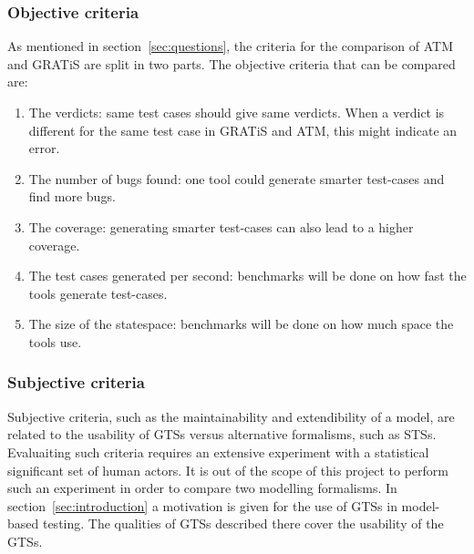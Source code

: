 \subsubsection{Objective criteria}
As mentioned in section~\ref{sec:questions}, the criteria for the comparison of ATM and GRATiS are split in two parts. The objective criteria that can be compared are:
\begin{enumerate}
  \item The verdicts: same test cases should give same verdicts. When a verdict is different for the same test case in GRATiS and ATM, this might indicate an error.
  \item The number of bugs found: one tool could generate smarter test-cases and find more bugs.
  \item The coverage: generating smarter test-cases can also lead to a higher coverage.
  \item The test cases generated per second: benchmarks will be done on how fast the tools generate test-cases.
  \item The size of the statespace: benchmarks will be done on how much space the tools use.
\end{enumerate}

\subsubsection{Subjective criteria}
Subjective criteria, such as the maintainability and extendibility of a model, are related to the usability of GTSs versus alternative formalisms, such as STSs. Evaluaiting such criteria requires an extensive experiment with a statistical significant set of human actors. It is out of the scope of this project to perform such an experiment in order to compare two modelling formalisms. In section~\ref{sec:introduction} a motivation is given for the use of GTSs in model-based testing. The qualities of GTSs described there cover the usability of the GTSs.



